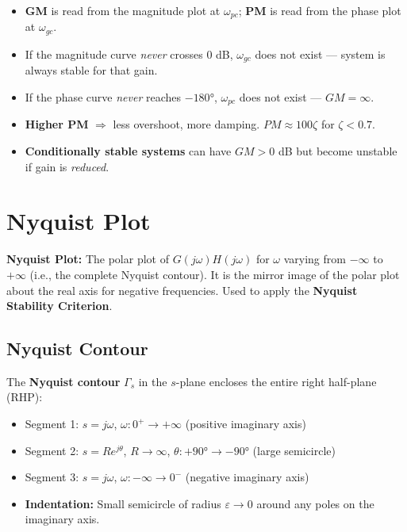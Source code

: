 \documentclass[12pt,a4paper]{article}
\begin{document}
\begin{tcolorbox}[exambox, title={Exam Tips --- GM and PM}]
\begin{itemize}[leftmargin=*, itemsep=3pt, topsep=0pt]
  \item \textbf{GM} is read from the magnitude plot at $\omega_{pc}$; \textbf{PM} is read from the phase plot at $\omega_{gc}$.
  \item If the magnitude curve \textit{never} crosses 0 dB, $\omega_{gc}$ does not exist --- system is always stable for that gain.
  \item If the phase curve \textit{never} reaches $-180°$, $\omega_{pc}$ does not exist --- $GM = \infty$.
  \item \textbf{Higher PM} $\Rightarrow$ less overshoot, more damping. $PM \approx 100\zeta$ for $\zeta < 0.7$.
  \item \textbf{Conditionally stable systems} can have $GM > 0$ dB but become unstable if gain is \textit{reduced}.
\end{itemize}
\end{tcolorbox}

\section{Nyquist Plot}

\begin{tcolorbox}[defbox]
\textbf{Nyquist Plot:} The polar plot of $G(j\omega)H(j\omega)$ for $\omega$ varying from $-\infty$ to $+\infty$ (i.e., the complete Nyquist contour). It is the mirror image of the polar plot about the real axis for negative frequencies. Used to apply the \textbf{Nyquist Stability Criterion}.
\end{tcolorbox}

\subsection{Nyquist Contour}

The \textbf{Nyquist contour} $\Gamma_s$ in the $s$-plane encloses the entire right half-plane (RHP):
\begin{itemize}[leftmargin=*, itemsep=2pt]
  \item Segment 1: $s = j\omega$, $\omega: 0^+ \to +\infty$ (positive imaginary axis)
  \item Segment 2: $s = Re^{j\theta}$, $R\to\infty$, $\theta: +90° \to -90°$ (large semicircle)
  \item Segment 3: $s = j\omega$, $\omega: -\infty \to 0^-$ (negative imaginary axis)
  \item \textbf{Indentation:} Small semicircle of radius $\varepsilon\to 0$ around any poles on the imaginary axis.
\end{itemize}
\end{document}
